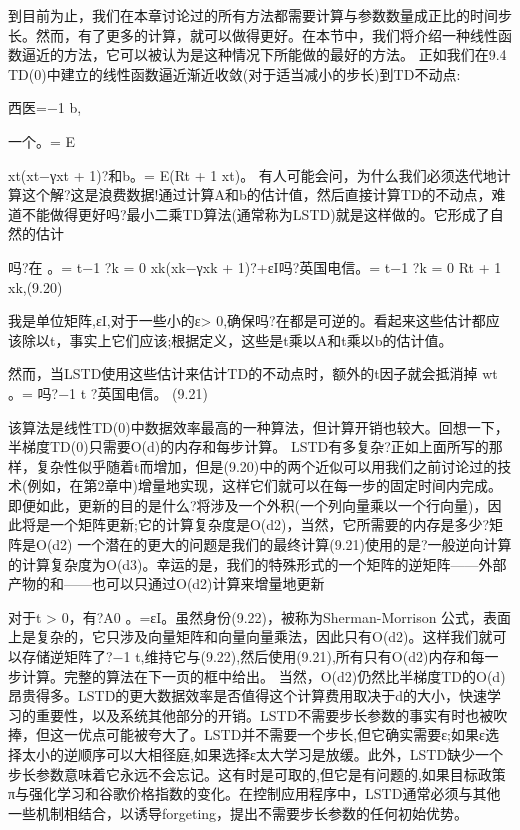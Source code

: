 {到目前为止，我们在本章讨论过的所有方法都需要计算与参数数量成正比的时间步长。然而，有了更多的计算，就可以做得更好。在本节中，我们将介绍一种线性函数逼近的方法，它可以被认为是这种情况下所能做的最好的方法。
正如我们在9.4 TD(0)中建立的线性函数逼近渐近收敛(对于适当减小的步长)到TD不动点:

西医=−1 b,

一个。= E

xt(xt−γxt + 1)?和b。= E(Rt + 1 xt)。
有人可能会问，为什么我们必须迭代地计算这个解?这是浪费数据!通过计算A和b的估计值，然后直接计算TD的不动点，难道不能做得更好吗?最小二乘TD算法(通常称为LSTD)就是这样做的。它形成了自然的估计


吗?在
。=
t−1 ?k = 0
xk(xk−γxk + 1)?+εI吗?英国电信。=
t−1 ?k = 0
Rt + 1 xk,(9.20)

我是单位矩阵,εI,对于一些小的ε> 0,确保吗?在都是可逆的。看起来这些估计都应该除以t，事实上它们应该;根据定义，这些是t乘以A和t乘以b的估计值。

然而，当LSTD使用这些估计来估计TD的不动点时，额外的t因子就会抵消掉
wt
。=
吗?−1 t ?英国电信。 					(9.21)

该算法是线性TD(0)中数据效率最高的一种算法，但计算开销也较大。回想一下，半梯度TD(0)只需要O(d)的内存和每步计算。
LSTD有多复杂?正如上面所写的那样，复杂性似乎随着t而增加，但是(9.20)中的两个近似可以用我们之前讨论过的技术(例如，在第2章中)增量地实现，这样它们就可以在每一步的固定时间内完成。即便如此，更新的目的是什么?将涉及一个外积(一个列向量乘以一个行向量)，因此将是一个矩阵更新;它的计算复杂度是O(d2)，当然，它所需要的内存是多少?矩阵是O(d2)
一个潜在的更大的问题是我们的最终计算(9.21)使用的是?一般逆向计算的计算复杂度为O(d3)。幸运的是，我们的特殊形式的一个矩阵的逆矩阵——外部产物的和——也可以只通过O(d2)计算来增量地更新
 

对于t > 0，有?A0
。=εI。虽然身份(9.22)，被称为Sherman-Morrison
公式，表面上是复杂的，它只涉及向量矩阵和向量向量乘法，因此只有O(d2)。这样我们就可以存储逆矩阵了?−1 t,维持它与(9.22),然后使用(9.21),所有只有O(d2)内存和每一步计算。完整的算法在下一页的框中给出。
当然，O(d2)仍然比半梯度TD的O(d)昂贵得多。LSTD的更大数据效率是否值得这个计算费用取决于d的大小，快速学习的重要性，以及系统其他部分的开销。LSTD不需要步长参数的事实有时也被吹捧，但这一优点可能被夸大了。LSTD并不需要一个步长,但它确实需要ε;如果ε选择太小的逆顺序可以大相径庭,如果选择ε太大学习是放缓。此外，LSTD缺少一个步长参数意味着它永远不会忘记。这有时是可取的,但它是有问题的,如果目标政策π与强化学习和谷歌价格指数的变化。在控制应用程序中，LSTD通常必须与其他一些机制相结合，以诱导forgeting，提出不需要步长参数的任何初始优势。

}
